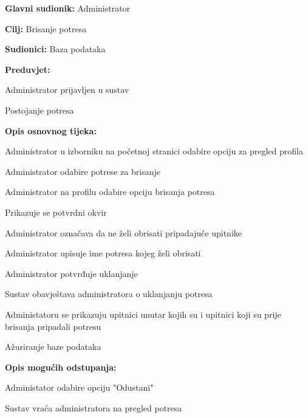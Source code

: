 			\noindent {}
			\begin{packed_item}

				\item \textbf{Glavni sudionik:} Administrator
				\item \textbf{Cilj:} Brisanje potresa
				\item \textbf{Sudionici:} Baza podataka
				\item \textbf{Preduvjet:}
					\begin{packed_item}
						\item Administrator prijavljen u sustav
						\item Postojanje potresa
					\end{packed_item}
				\item \textbf{Opis osnovnog tijeka:}
				
				\item[] \begin{packed_enum}

					\item Administrator u izborniku na početnoj stranici odabire opciju za pregled profila
					\item Administrator odabire potrese za brisanje
					\item Administrator na profilu odabire opciju brisanja potresa
					\item Prikazuje se potvrdni okvir
					\item Administrator označava da ne želi obrisati pripadajuće upitnike
					\item Administrator upisuje ime potresa kojeg želi obrisati
					\item Administrator potvrđuje uklanjanje
					\item Sustav obavještava administratora o uklanjanju potresa
					\item Administatoru se prikazuju upitnici unutar kojih su i upitnici koji su prije brisanja pripadali potresu
					\item Ažuriranje baze podataka
					
				\end{packed_enum}
				
				\item  \textbf{Opis mogućih odstupanja:}
				
				\item[] \begin{packed_item}
				 
					\item[7.a] Administator odabire opciju "Odustani"
					\item[] \begin{packed_enum}
						
						\item Sustav vraća administratora na pregled potresa
						
						\end{packed_enum}
					
				\end{packed_item}
			\end{packed_item}
					
